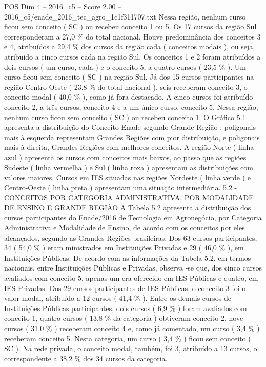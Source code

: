 \begin{textsample}{POS Dim 4 – 2016\_c5 – Score 2.00 – 2016\_c5/enade\_2016\_tec\_agro\_1c1f311707.txt}
Nessa região, nenhum curso ficou sem conceito ( SC ) ou recebeu conceito 1 ou 5.
Os 17 cursos da região Sul corresponderam a 27,0 \% do total nacional.
Houve predominância dos conceitos 3 e 4, atribuídos a 29,4 \% dos cursos da região cada ( conceitos modais ), ou seja, atribuído a cinco cursos cada na região Sul.
Os conceitos 1 e 2 foram atribuídos a dois cursos ( um curso, cada ) e o conceito 5, a quatro cursos ( 23,5 \% ).
Um curso ficou sem conceito ( SC ) na região Sul.
Já dos 15 cursos participantes na região Centro-Oeste ( 23,8 \% do total nacional ), seis receberam conceito 3, o conceito modal ( 40,0 \% ), como já fora destacado.
A cinco cursos foi atribuído conceito 2, a três cursos, conceito 4 e a um único curso, conceito 5.
Nessa região, nenhum curso ficou sem conceito ( SC ) ou recebeu conceito 1.
O Gráfico 5.1 apresenta a distribuição do Conceito Enade segundo Grande Região : poligonais mais à esquerda representam Grandes Regiões com pior distribuição, e poligonais mais à direita, Grandes Regiões com melhores conceitos.
A região Norte ( linha azul ) apresenta os cursos com conceitos mais baixos, ao passo que as regiões Sudeste ( linha vermelha ) e Sul ( linha roxa ) apresentam as distribuições com valores maiores.
Cursos em IES situadas nas regiões Nordeste ( linha verde ) e Centro-Oeste ( linha preta ) apresentam uma situação intermediária. 5.2 - CONCEITOS POR CATEGORIA ADMINISTRATIVA, POR MODALIDADE DE ENSINO E GRANDE REGIÃO A Tabela 5.2 apresenta a distribuição dos cursos participantes do Enade/2016 de Tecnologia em Agronegócio, por Categoria Administrativa e Modalidade de Ensino, de acordo com os conceitos por eles alcançados, segundo as Grandes Regiões brasileiras.
Dos 63 cursos participantes, 34 ( 54,0 \% ) eram ministrados em Instituições Privadas e 29 ( 46,0 \% ), em Instituições Públicas.
De acordo com as informações da Tabela 5.2, em termos nacionais, entre Instituições Públicas e Privadas, observa -se que, dos cinco cursos avaliados com conceito 5, apenas um era oferecido em IES Públicas e quatro, em IES Privadas.
Dos 29 cursos participantes de IES Públicas, o conceito 3 foi o valor modal, atribuído a 12 cursos ( 41,4 \% ).
Entre os demais cursos de Instituições Públicas participantes, dois cursos ( 6,9 \% ) foram avaliados com conceito 1, quatro cursos ( 13,8 \% da categoria ) obtiveram conceito 2, nove cursos ( 31,0 \% ) receberam conceito 4 e, como já comentado, um curso ( 3,4 \% ) receberam conceito 5.
Nesta categoria, um curso ( 3,4 \% ) ficou sem conceito ( SC ).
Na rede privada, o conceito modal, também, foi 3, atribuído a 13 cursos, o correspondente a 38,2 \% dos 34 cursos da categoria.

\end{textsample}
